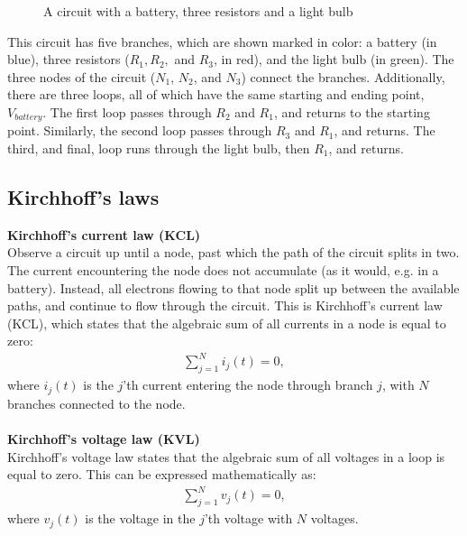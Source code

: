 \begin{figure}[H]
 
 \caption{A circuit with a battery, three resistors and a light bulb}
\end{figure}

\noindent This circuit has five branches, which are shown marked in color: a battery (in blue), three resistors ($R_1, R_2,$ and $R_3$, in red), and the light bulb (in green). The three nodes of the circuit ($N_1$, $N_2$, and $N_3$) connect the branches. Additionally, there are three loops, all of which have the same starting and ending point, $V_{battery}$. The first loop passes through $R_2$ and $R_1$, and returns to the starting point. Similarly, the second loop passes through $R_3$ and $R_1$, and returns. The third, and final, loop runs through the light bulb, then $R_1$, and returns. 

\subsection{Kirchhoff's laws}\label{Klaws}
\textbf{Kirchhoff's current law (KCL)}
\\
Observe a circuit up until a node, past which the path of the circuit splits in two. The current encountering the node does not accumulate (as it would, e.g. in a battery). Instead, all electrons flowing to that node split up between the available paths, and continue to flow through the circuit. This is Kirchhoff’s current law (KCL), which states that the algebraic sum of all currents in a node is equal to zero:
\begin{align}
\sum_{j=1}^{N} i_{j}(t) = 0,
\end{align}
where $i_{j}(t)$ is the $j$'th current entering the node through branch $j$, with $N$ branches connected to the node. \cite[page~32]{bcircuit}
\\
\\
\textbf{Kirchhoff's voltage law (KVL)}
\\
Kirchhoff's voltage law states that the algebraic sum of all voltages in a loop is equal to zero. This can be expressed mathematically as:
\begin{align}
\sum_{j=1}^{N} v_{j}(t) = 0,
\end{align}
where $v_{j}(t)$ is the voltage in the $j$'th voltage with $N$ voltages. \citep[page~34]{bcircuit}\\

